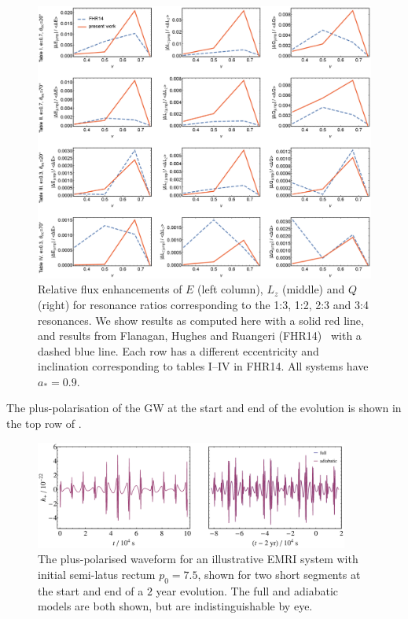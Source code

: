 \begin{figure}
\centering
\includegraphics[width=\textwidth]{res_flux_FHR}
\caption{\label{fig:res-flux-FHR}Relative flux enhancements of $E$ (left column), $L_z$ (middle) and $Q$ (right) for resonance ratios corresponding to the 1:3, 1:2, 2:3 and 3:4 resonances. We show results as computed here with a solid red line, and results from Flanagan, Hughes and Ruangeri (FHR14)~\cite{Flanagan2012a} with a dashed blue line. Each row has a different eccentricity and inclination corresponding to tables I--IV in FHR14. All systems have $a_\ast=0.9$.}
\end{figure}


The plus-polarisation of the GW at the start and end of the evolution is shown in the top row of .
\begin{figure}
\centering
\includegraphics[width=0.92\textwidth]{Fig_good_waveform}
\caption{\label{fig:good-waveform}The plus-polarised waveform for an illustrative EMRI system with initial semi-latus rectum $p_0=7.5$, shown for two short segments at the start and end of a $2$ year evolution. The full and adiabatic models are both shown, but are indistinguishable by eye.}
\end{figure}


